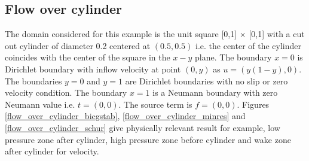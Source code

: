 \documentclass[a4paper,twoside,openright]{book}
\begin{document}
\subsection{Flow over cylinder} \label{flow_over_cylinder_stokes}

The domain considered for this example is the unit square [0,1] $\times$ [0,1] with a cut out cylinder of diameter 0.2 centered at $(0.5,0.5)$ i.e. the center of the cylinder coincides with the center of the square in the $x-y$ plane. The boundary ${x=0}$ is Dirichlet boundary with inflow velocity at point $(0,y)$ as $u = (y(1-y), 0)$. The boundaries ${y = 0}$ and ${y = 1}$ are Dirichlet boundaries with no slip or zero velocity condition. The boundary ${x = 1}$ is a Neumann boundary with zero Neumann value i.e. $t = (0, 0)$. The source term is $f = (0, 0)$. Figures \ref{flow_over_cylinder_bicgstab}, \ref{flow_over_cylinder_minres} and \ref{flow_over_cylinder_schur} give physically relevant result for example, low pressure zone after cylinder, high pressure zone before cylinder and wake zone after cylinder for velocity.
\end{document}

